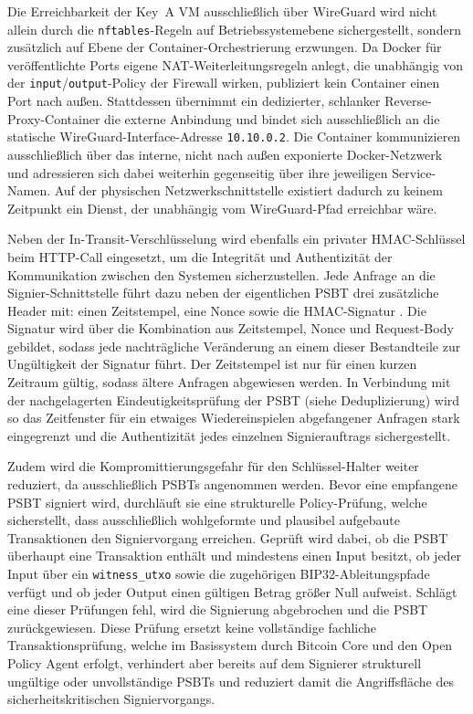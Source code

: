 Die Erreichbarkeit der Key~A \ac{VM} ausschließlich über WireGuard wird nicht allein durch die \texttt{nftables}-Regeln auf Betriebssystemebene sichergestellt, sondern zusätzlich auf Ebene der Container-Orchestrierung erzwungen. Da Docker für veröffentlichte Ports eigene \ac{NAT}-Weiterleitungsregeln anlegt, die unabhängig von der \texttt{input}/\texttt{output}-Policy der Firewall wirken, publiziert kein Container einen Port nach außen. Stattdessen übernimmt ein dedizierter, schlanker Reverse-Proxy-Container die externe Anbindung und bindet sich ausschließlich an die statische WireGuard-Interface-Adresse \texttt{10.10.0.2}. Die Container kommunizieren ausschließlich über das interne, nicht nach außen exponierte Docker-Netzwerk und adressieren sich dabei weiterhin gegenseitig über ihre jeweiligen Service-Namen. Auf der physischen Netzwerkschnittstelle existiert dadurch zu keinem Zeitpunkt ein Dienst, der unabhängig vom WireGuard-Pfad erreichbar wäre.

\label{sec:HMAC}
Neben der In-Transit-Verschlüsselung wird ebenfalls ein privater \ac{HMAC}-Schlüssel beim \ac{HTTP}-Call eingesetzt, um die Integrität und Authentizität der Kommunikation zwischen den Systemen sicherzustellen.
Jede Anfrage an die Signier-Schnittstelle führt dazu neben der eigentlichen \ac{PSBT} drei zusätzliche Header mit: einen Zeitstempel, eine Nonce sowie die \ac{HMAC}-Signatur \cite{HMAC, rfc2104}.
Die Signatur wird über die Kombination aus Zeitstempel, Nonce und Request-Body gebildet, sodass jede nachträgliche Veränderung an einem dieser Bestandteile zur Ungültigkeit der Signatur führt.
Der Zeitstempel ist nur für einen kurzen Zeitraum gültig, sodass ältere Anfragen abgewiesen werden. In Verbindung mit der nachgelagerten Eindeutigkeitsprüfung der \ac{PSBT} (siehe Deduplizierung) wird so das Zeitfenster für ein etwaiges Wiedereinspielen abgefangener Anfragen stark eingegrenzt und die Authentizität jedes einzelnen Signierauftrags sichergestellt.

Zudem wird die Kompromittierungsgefahr für den Schlüssel-Halter weiter reduziert, da ausschließlich \acp{PSBT} angenommen werden.
Bevor eine empfangene \ac{PSBT} signiert wird, durchläuft sie eine strukturelle Policy-Prüfung, welche sicherstellt, dass ausschließlich wohlgeformte und plausibel aufgebaute Transaktionen den Signiervorgang erreichen. Geprüft wird dabei, ob die \ac{PSBT} überhaupt eine Transaktion enthält und mindestens einen Input besitzt, ob jeder Input über ein \texttt{witness\_utxo} sowie die zugehörigen \ac{BIP}32-Ableitungspfade verfügt und ob jeder Output einen gültigen Betrag größer Null aufweist.
Schlägt eine dieser Prüfungen fehl, wird die Signierung abgebrochen und die \ac{PSBT} zurückgewiesen.
Diese Prüfung ersetzt keine vollständige fachliche Transaktionsprüfung, welche im Basissystem durch Bitcoin Core und den Open Policy Agent erfolgt, verhindert aber bereits auf dem Signierer strukturell ungültige oder unvollständige \acp{PSBT} und reduziert damit die Angriffsfläche des sicherheitskritischen Signiervorgangs.

